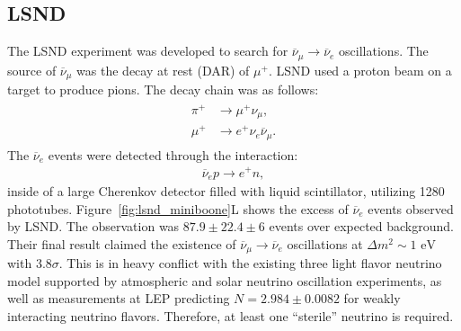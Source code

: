 \documentclass[aps,prd,twocolumn,nofootinbib]{revtex4-1}
\begin{document}
\subsection{LSND}
The LSND experiment was developed to search for $\overline{\nu}_\mu \rightarrow \overline{\nu}_e$ oscillations. The source of $\overline{\nu}_\mu$ was the decay at rest (DAR) of $\mu^+$. LSND used a proton beam on a target to produce pions. The decay chain was as follows:
\begin{align}
  \begin{split}
    \pi^+ &\rightarrow \mu^+  \nu_\mu, \\
    \mu^+ &\rightarrow e^+  \nu_e  \overline{\nu}_\mu.
  \end{split}
\end{align}
The $\overline{\nu}_e$ events were detected through the interaction:
\begin{align}
  \overline{\nu}_e  p \rightarrow e^+ n,
\end{align}
inside of a large Cherenkov detector filled with liquid scintillator, utilizing 1280 phototubes. Figure~\ref{fig:lsnd_miniboone}L shows the excess of $\overline{\nu}_e$ events observed by LSND. The observation was $87.9\pm 22.4\pm6$ events over expected background. Their final result claimed the existence of $\overline{\nu}_\mu\rightarrow\overline{\nu}_e$ oscillations at $\Delta m^2 \sim 1\text{ eV}$ with 3.8$\sigma$. This is in heavy conflict with the existing three light flavor neutrino model supported by atmospheric and solar neutrino oscillation experiments, as well as measurements at LEP predicting $N=2.984\pm0.0082$ for weakly interacting neutrino flavors. Therefore, at least one ``sterile'' neutrino is required.
\end{document}
